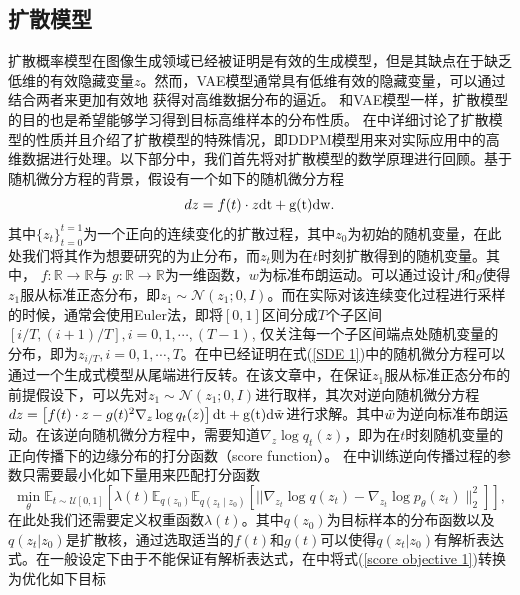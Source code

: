 \subsection{扩散模型}
扩散概率模型在图像生成领域已经被证明是有效的生成模型，但是其缺点在于缺乏低维的有效隐藏变量$z$。然而，VAE模型通常具有低维有效的隐藏变量，可以通过结合两者来更加有效地
获得对高维数据分布的逼近。
和VAE模型一样，扩散模型的目的也是希望能够学习得到目标高维样本的分布性质。 在\cite{diffusion}中详细讨论了扩散模型的性质并且介绍了扩散模型的特殊情况，即DDPM模型用来对实际应用中的高维数据进行处理。以下部分中，我们首先将对扩散模型的数学原理进行回顾。基于随机微分方程的背景，假设有一个如下的随机微分方程
\begin{equation}
    dz = f(t)\cdot z \rm{dt}+g(t)\rm{dw}.
    \label{SDE 1}
\end{equation}
其中$\{z_t\}_{t=0}^{t=1}$为一个正向的连续变化的扩散过程，其中$z_0$为初始的随机变量，在此处我们将其作为想要研究的为止分布，而$z_t$则为在$t$时刻扩散得到的随机变量。其中， $f: \mathbb{R}\rightarrow \mathbb{R}$与
 $g: \mathbb{R}\rightarrow \mathbb{R}$为一维函数，$w$为标准布朗运动。可以通过设计$f$和$g$使得$z_1$服从标准正态分布，即$z_1\sim \mathcal{N}(z_1;0,I)$。而在实际对该连续变化过程进行采样的时候，通常会使用Euler法，即将$[0,1]$区间分成$T$个子区间$[i/T,(i+1)/T], i =0,1,\cdots, (T-1)$, 仅关注每一个子区间端点处随机变量的分布，即为$z_{i/T},i=0,1,\cdots,T$。在\cite{diffusion}中已经证明在式(\ref{SDE 1})中的随机微分方程可以通过一个生成式模型从尾端进行反转。在该文章中，在保证$z_1$服从标准正态分布的前提假设下，可以先对$z_1\sim \mathcal{N}(z_1;0,I)$进行取样，其次对逆向随机微分方程 $dz = \left[f(t)\cdot z -g(t)^2 \nabla_z \log q_t(z)\right] \rm{dt} + g(t)d \Tilde{w}$进行求解。其中$\Tilde{w}$为逆向标准布朗运动。在该逆向随机微分方程中，需要知道$\nabla_z \log q_t(z)$，即为在$t$时刻随机变量的正向传播下的边缘分布的打分函数（score function）。
 在\cite{diffusion}中训练逆向传播过程的参数只需要最小化如下量用来匹配打分函数
\begin{equation}
    \min _{{\theta}} \mathbb{E}_{t \sim \mathcal{U}[0,1]}\left[\lambda(t) \mathbb{E}_{q\left({z}_0\right)} \mathbb{E}_{q\left({z}_t \mid {z}_0\right)}\left[|| \nabla_{{z}_t} \log q\left({z}_t\right)-\nabla_{{z}_t} \log p_{{\theta}}\left({z}_t\right) \|_2^2\right]\right],
    \label{score objective 1}
\end{equation}
在此处我们还需要定义权重函数$\lambda(t)$。其中$q(z_0)$为目标样本的分布函数以及$q(z_t|z_0)$是扩散核，通过选取适当的$f(t)$和$g(t)$可以使得$q(z_t|z_0)$有解析表达式。在一般设定下由于不能保证有解析表达式，在\cite{diffusion}中将式(\ref{score objective 1})转换为优化如下目标
